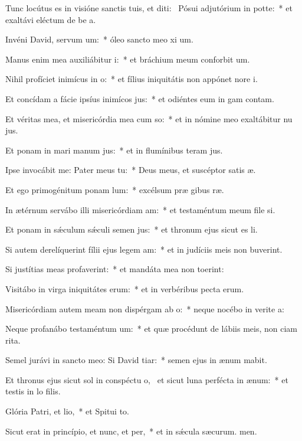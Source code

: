 \item Tunc locútus es in visióne sanctis tuis, et diti:~\pscross{} Pósui adjutórium in potte:~* et exaltávi eléctum de be a.
\item Invéni David, servum um:~* óleo sancto meo xi um.
\item Manus enim mea auxiliábitur i:~* et bráchium meum conforbit um.
\item Nihil profíciet inimícus in o:~* et fílius iniquitátis non appónet nore i.
\item Et concídam a fácie ipsíus inimícos jus:~* et odiéntes eum in gam contam.
\item Et véritas mea, et misericórdia mea cum so:~* et in nómine meo exaltábitur nu jus.
\item Et ponam in mari manum jus:~* et in flumínibus teram jus.
\item Ipse invocábit me: Pater meus  tu:~* Deus meus, et suscéptor satis æ.
\item Et ego primogénitum ponam lum:~* excélsum præ gibus ræ.
\item In ætérnum servábo illi misericórdiam am:~* et testaméntum meum file si.
\item Et ponam in sǽculum sǽculi semen jus:~* et thronum ejus sicut es li.
\item Si autem derelíquerint fílii ejus legem am:~* et in judíciis meis non buverint.
\item Si justítias meas profaverint:~* et mandáta mea non toerint:
\item Visitábo in virga iniquitátes erum:~* et in verbéribus pecta erum.
\item Misericórdiam autem meam non dispérgam ab o:~* neque nocébo in verite a:
\item Neque profanábo testaméntum um:~* et quæ procédunt de lábiis meis, non ciam rita.
\item Semel jurávi in sancto meo: Si David tiar:~* semen ejus in ænum mabit.
\item Et thronus ejus sicut sol in conspéctu o,~\pscross{} et sicut luna perfécta in ænum:~* et testis in lo filis.
\item Glória Patri, et lio,~* et Spitui to.
\item Sicut erat in princípio, et nunc, et per,~* et in sǽcula sæcurum. men.
